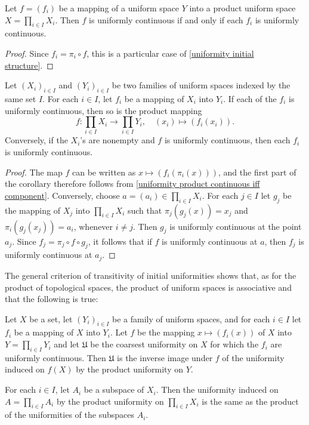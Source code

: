 \begin{proposition}\label{uniformity product continuous iff component}
Let $f=(f_i)$ be a mapping of a uniform space $Y$ into a product uniform space $X=\prod_{i\in I}X_i$. Then $f$ is uniformly continuous if and only if each $f_i$ is uniformly continuous.
\end{proposition}
\begin{proof}
Since $f_i=\pi_i\circ f$, this is a particular case of \cref{uniformity initial structure}.
\end{proof}
\begin{corollary}\label{uniform space product map uniformly continuous iff}
Let $(X_i)_{i\in I}$ and $(Y_i)_{i\in I}$ be two families of uniform spaces indexed by the same set $I$. For each $i\in I$, let $f_i$ be a mapping of $X_i$ into $Y_i$. If each of the $f_i$ is uniformly continuous, then so is the product mapping
\[f:\prod_{i\in I}X_i\to\prod_{i\in I}Y_i,\quad (x_i)\mapsto(f_i(x_i)).\]
Conversely, if the $X_i$'s are nonempty and $f$ is uniformly continuous, then each $f_i$ is uniformly continuous.
\end{corollary}
\begin{proof}
The map $f$ can be written as $x\mapsto(f_i(\pi_i(x)))$, and the first part of the corollary therefore follows from \cref{uniformity product continuous iff component}. Conversely, choose $a=(a_i)\in\prod_{i\in I}X_i$. For each $j\in I$ let $g_j$ be the mapping of $X_j$ into $\prod_{i\in I}X_i$ such that $\pi_j(g_j(x))=x_j$ and $\pi_i(g_j(x_j))=a_i$, whenever $i\neq j$. Then $g_j$ is uniformly continuous at the point $a_j$. Since $f_j=\pi_j\circ f\circ g_j$, it follows that if $f$ is uniformly continuous at $a$, then $f_j$ is uniformly continuous at $a_j$.
\end{proof}
The general criterion of transitivity of initial uniformities shows that, as for the product of topological spaces, the product of uniform spaces is associative and that the following is true:
\begin{proposition}
Let $X$ be a set, let $(Y_i)_{i\in I}$ be a family of uniform spaces, and for each $i\in I$ let $f_i$ be a mapping of $X$ into $Y_i$. Let $f$ be the mapping $x\mapsto(f_i(x))$ of $X$ into $Y=\prod_{i\in I}Y_i$ and let $\mathfrak{U}$ be the coarsest uniformity on $X$ for which the $f_i$ are uniformly continuous. Then $\mathfrak{U}$ is the inverse image under $f$ of the uniformity induced on $f(X)$ by the product uniformity on $Y$.
\end{proposition}
\begin{corollary}
For each $i\in I$, let $A_i$ be a subspace of $X_i$. Then the uniformity induced on $A=\prod_{i\in I}A_i$ by the product uniformity on $\prod_{i\in I}X_i$ is the same as the product of the uniformities of the subspaces $A_i$.
\end{corollary}
